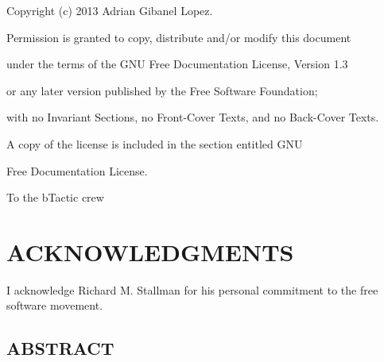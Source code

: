 Copyright (c) 2013 Adrian Gibanel Lopez.

Permission is granted to copy, distribute and/or modify this document

under the terms of the GNU Free Documentation License, Version 1.3

or any later version published by the Free Software Foundation;

with no Invariant Sections, no Front-Cover Texts, and no Back-Cover
Texts.

A copy of the license is included in the section entitled \textquotedbl{}GNU

Free Documentation License\textquotedbl{}.

\newpage



\newpage
\null\vfil
\begin{center}
To the bTactic crew
\end{center}
\par\vfil\newpage


\chapter*{ACKNOWLEDGMENTS}
I acknowledge Richard M. Stallman for his personal commitment to the free software movement.
\par\newpage





\section* {ABSTRACT}
             \thispagestyle{empty}
                  \addtocounter{page}{-1}
                \begin{center}
                  {\bf\expandafter\uppercase\expandafter{\actualtitle}}\\
                  \vspace{12pt}
                  \actualauthor \\
                  \vspace{12pt}
                \end{center}


\pagestyle{headings}

\tableofcontents
\listoffigures
\newpage

\clearpage{} %
